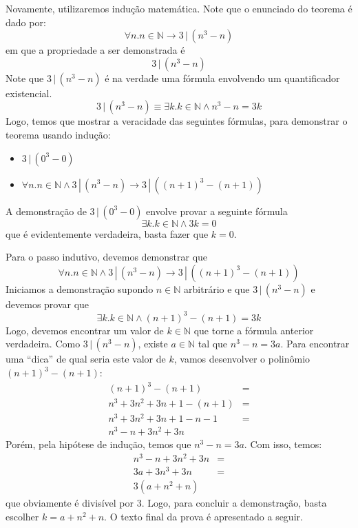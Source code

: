 \begin{Commentary}
Novamente, utilizaremos indução matemática. Note que o enunciado do
teorema é dado por:
\[
\forall n. n\in\mathbb{N} \to 3\,|\,(n^3 - n)
\]
em que a propriedade a ser demonstrada é
\[
3\,|\,(n^3 - n)
\]
Note que $3\,|\,(n^3 - n)$ é na verdade uma fórmula envolvendo um
quantificador existencial.
\[
3\,|\,(n^3 - n) \equiv \exists k. k\in\mathbb{N}\land n^3 - n = 3k
\]
Logo, temos que mostrar a veracidade das seguintes fórmulas, para
demonstrar o teorema usando indução:
\begin{itemize}
  \item $3\,|\,(0^3 - 0)$
  \item $\forall n. n\in\mathbb{N}\land 3\,|\,(n^3 - n)\to
    3\,|\,((n+1)^3 - (n + 1))$
\end{itemize}
A demonstração de $3\,|\,(0^3 - 0)$ envolve provar a seguinte fórmula
\[
\exists k. k\in\mathbb{N}\land 3k = 0
\]
que é evidentemente verdadeira, basta fazer que $k = 0$.

Para o passo indutivo, devemos demonstrar que
\[\forall n. n\in\mathbb{N}\land 3\,|\,(n^3 - n)\to
    3\,|\,((n+1)^3 - (n + 1))\]
Iniciamos a demonstração supondo $n\in\mathbb{N}$ arbitrário e que
$3\,|\,(n^3 - n)$ e devemos provar que
\[
\exists k. k\in\mathbb{N}\land (n + 1)^3 - (n+1) = 3k
\]
Logo, devemos encontrar um valor de $k\in\mathbb{N}$ que torne a
fórmula anterior verdadeira. Como $3\,|\,(n^3 - n)$, existe $a \in
\mathbb{N}$ tal que $n^3 - n = 3a$. Para encontrar uma ``dica'' de
qual seria este valor de $k$, vamos desenvolver o polinômio $(n+1)^3 -
(n + 1)$:
\[
\begin{array}{lc}
(n+1)^3 - (n + 1) & =\\
n^3 + 3n^2 + 3n + 1 - (n + 1) & = \\
n^3 + 3n^2 + 3n + 1 - n - 1 & = \\
n^3 -n + 3n^2 + 3n
\end{array}
\]
Porém, pela hipótese de indução, temos que $n^3 - n = 3a$. Com isso,
temos:
\[
\begin{array}{lc}
n^3 -n + 3n^2 + 3n & =\\
3a + 3n^3 + 3n & = \\
3 (a + n^2 + n)
\end{array}
\]
que obviamente é divisível por $3$. Logo, para concluir a
demonstração, basta escolher $k = a + n^2 + n$. O texto final da prova
é apresentado a seguir.
\end{Commentary}
